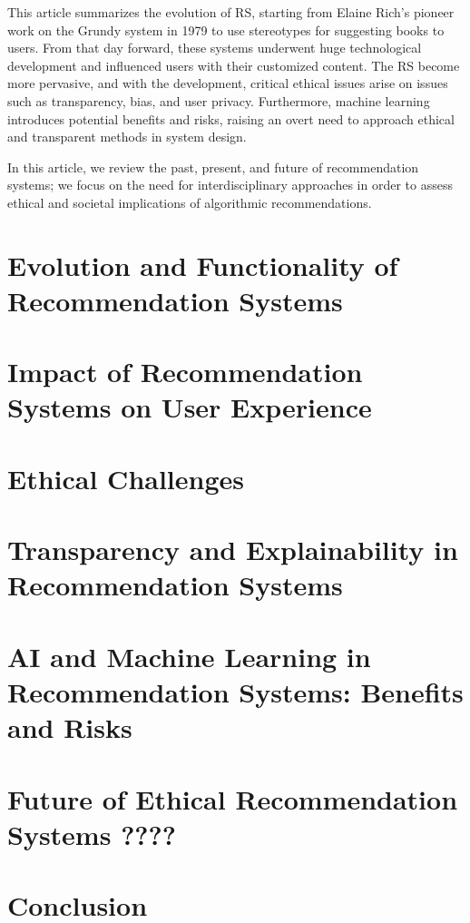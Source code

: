\documentclass{article}
\begin{document}
This article summarizes the evolution of RS, starting from Elaine Rich's pioneer work on the Grundy system in 1979 \cite{RICH1979329} to use stereotypes for suggesting books to users. From that day forward, these systems underwent huge technological development and influenced users with their customized content. The RS become more pervasive, and with the development, critical ethical issues arise on issues such as transparency, bias, and user privacy. Furthermore, machine learning introduces potential benefits and risks, raising an overt need to approach ethical and transparent methods in system design.

In this article, we review the past, present, and future of recommendation systems; we focus on the need for interdisciplinary approaches in order to assess ethical and societal implications of algorithmic recommendations. 
\section{Evolution and Functionality of Recommendation Systems}
\section{Impact of Recommendation Systems on User Experience}
\section{Ethical Challenges}
\section{Transparency and Explainability in Recommendation Systems}
\section{AI and Machine Learning in Recommendation Systems: Benefits and Risks}
\section{Future of Ethical Recommendation Systems ????}
\section{Conclusion}


\end{document}
